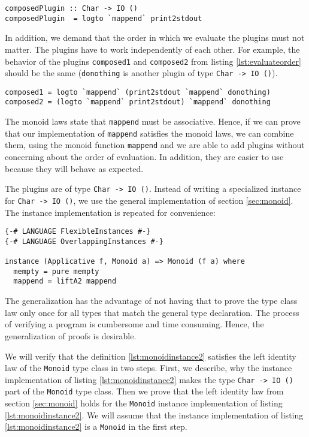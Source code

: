 \begin{lstlisting}[caption={Composition of two plugins}, label={lst:composition}]
composedPlugin :: Char -> IO ()
composedPlugin  = logto `mappend` print2stdout
\end{lstlisting}

In addition, we demand that the order in which we evaluate the plugins must not matter. The plugins have to work independently of each other. For example, the behavior of the plugins \verb|composed1| and \verb|composed2| from listing \ref{lst:evaluateorder} should be the same (\verb|donothing| is another plugin of type \verb|Char -> IO ()|).

\begin{lstlisting}[caption={The order in which we evaluate the plugins does not matter}, label={lst:evaluateorder}]
composed1 = logto `mappend` (print2stdout `mappend` donothing)
composed2 = (logto `mappend` print2stdout) `mappend` donothing
\end{lstlisting}

The monoid laws state that \verb|mappend| must be associative. Hence, if we can prove that our implementation of \verb|mappend| satisfies the monoid laws, we can combine them, using the monoid function \verb|mappend| and we are able to add plugins without concerning about the order of evaluation. In addition, they are easier to use because they will behave as expected.

The plugins are of type \verb|Char -> IO ()|. Instead of writing a specialized instance for \verb|Char -> IO ()|, we use the general implementation of section \ref{sec:monoid}.
The instance implementation is repeated for convenience:

\begin{lstlisting}[caption={Monoid instance},label={lst:monoidinstance2}]
{-# LANGUAGE FlexibleInstances #-}
{-# LANGUAGE OverlappingInstances #-}

instance (Applicative f, Monoid a) => Monoid (f a) where
  mempty = pure mempty
  mappend = liftA2 mappend
\end{lstlisting}
The generalization has the advantage of not having that to prove the type class law only once for all types that match the general type declaration. The process of verifying a program is cumbersome and time consuming. Hence, the generalization of proofs is desirable.

We will verify that the definition \ref{lst:monoidinstance2} satisfies the left identity law of the \verb|Monoid| type class in two steps. First, we describe, why the instance implementation of listing \ref{lst:monoidinstance2} makes the type \verb|Char -> IO ()| part of the \verb|Monoid| type class. Then we prove that the left identity law from section \ref{sec:monoid} holds for the \verb|Monoid| instance implementation of listing \ref{lst:monoidinstance2}. We will assume that the instance implementation of listing \ref{lst:monoidinstance2} is a \verb|Monoid| in the first step.

